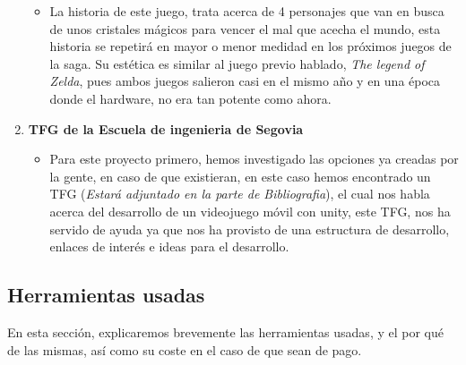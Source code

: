 \documentclass[a4paper]{article}
\begin{document}
\begin{enumerate}
\begin{itemize}
              \item La historia de este juego, trata acerca de 4 personajes que van en busca de unos cristales mágicos para vencer el mal que acecha el mundo, esta historia se repetirá en mayor o menor medidad en los próximos juegos de la saga. Su estética es similar al juego previo hablado, \textit{The legend of Zelda}, pues ambos juegos salieron casi en el mismo año y en una época donde el hardware, no era tan potente como ahora.
          \end{itemize}
    \item \textbf{TFG de la Escuela de ingenieria de Segovia}
          \begin{itemize}
              \item Para este proyecto primero, hemos investigado las opciones ya creadas por la gente, en caso de que existieran, en este caso hemos encontrado un TFG (\textit{Estará adjuntado en la parte de Bibliografia}), el cual nos habla acerca del desarrollo de un videojuego móvil con unity, este TFG, nos ha servido de ayuda ya que nos ha provisto de una estructura de desarrollo, enlaces de interés e ideas para el desarrollo.
          \end{itemize}
\end{enumerate}

\subsection{Herramientas usadas}
En esta sección, explicaremos brevemente las herramientas usadas, y el por qué de las mismas, así como su coste en el caso de que sean de pago.
\end{document}
